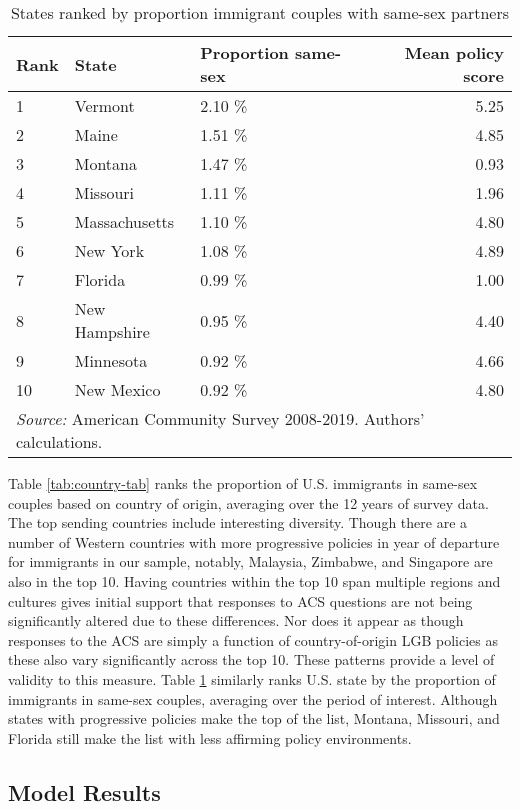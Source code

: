 \documentclass[
  11pt,
]{article}
\begin{document}
\begin{table}

\caption{\label{tab:state-tab}States ranked by proportion immigrant couples with same-sex partners}
\centering
\begin{tabular}[t]{lllr}
\toprule
Rank & State & Proportion same-sex & Mean policy score\\
\midrule
1 & Vermont & 2.10 \% & 5.25\\
2 & Maine & 1.51 \% & 4.85\\
3 & Montana & 1.47 \% & 0.93\\
4 & Missouri & 1.11 \% & 1.96\\
5 & Massachusetts & 1.10 \% & 4.80\\
6 & New York & 1.08 \% & 4.89\\
7 & Florida & 0.99 \% & 1.00\\
8 & New Hampshire & 0.95 \% & 4.40\\
9 & Minnesota & 0.92 \% & 4.66\\
10 & New Mexico & 0.92 \% & 4.80\\
\bottomrule
\multicolumn{4}{l}{\rule{0pt}{1em}\textit{Source:} American Community Survey 2008-2019. Authors' calculations.}\\
\end{tabular}
\end{table}

Table \ref{tab:country-tab} ranks the proportion of U.S. immigrants in same-sex couples based on country of origin, averaging over the 12 years of survey data. The top sending countries include interesting diversity. Though there are a number of Western countries with more progressive policies in year of departure for immigrants in our sample, notably, Malaysia, Zimbabwe, and Singapore are also in the top 10. Having countries within the top 10 span multiple regions and cultures gives initial support that responses to ACS questions are not being significantly altered due to these differences. Nor does it appear as though responses to the ACS are simply a function of country-of-origin LGB policies as these also vary significantly across the top 10. These patterns provide a level of validity to this measure. Table \ref{tab:state-tab} similarly ranks U.S. state by the proportion of immigrants in same-sex couples, averaging over the period of interest. Although states with progressive policies make the top of the list, Montana, Missouri, and Florida still make the list with less affirming policy environments.

\hypertarget{model-results}{%
\subsection{Model Results}\label{model-results}}
\end{document}
